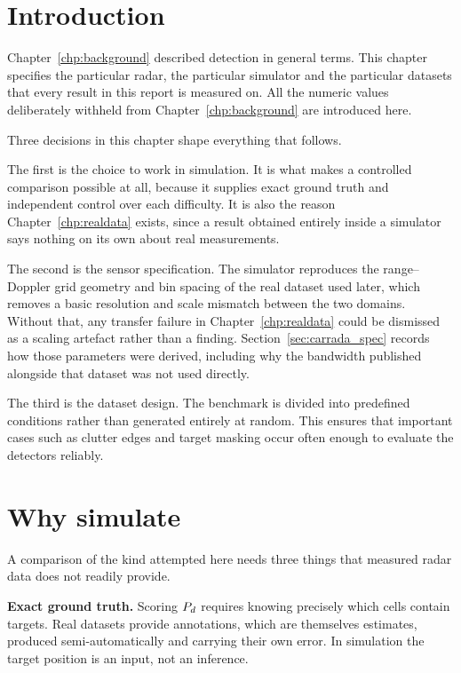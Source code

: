 
\section{Introduction}

Chapter~\ref{chp:background} described detection in general terms. This chapter specifies the
particular radar, the particular simulator and the particular datasets that every result in this
report is measured on. All the numeric values deliberately withheld from Chapter~\ref{chp:background}
are introduced here.

Three decisions in this chapter shape everything that follows.

The first is the choice to work in simulation. It is what makes a controlled comparison possible at
all, because it supplies exact ground truth and independent control over each difficulty. It is
also the reason Chapter~\ref{chp:realdata} exists, since a result obtained entirely inside a
simulator says nothing on its own about real measurements.

The second is the sensor specification. The simulator reproduces the range--Doppler grid geometry
and bin spacing of the real dataset used later, which removes a basic resolution and scale
mismatch between the two domains. Without that, any transfer failure in
Chapter~\ref{chp:realdata} could be dismissed as a scaling artefact rather than a finding.
Section~\ref{sec:carrada_spec} records how those parameters were derived, including why the
bandwidth published alongside that dataset was not used directly.

The third is the dataset design. The benchmark is divided into predefined conditions rather than
generated entirely at random. This ensures that important cases such as clutter edges and target
masking occur often enough to evaluate the detectors reliably.

\section{Why simulate}

A comparison of the kind attempted here needs three things that measured radar data does not
readily provide.

\textbf{Exact ground truth.} Scoring $P_{d}$ requires knowing precisely which cells contain targets.
Real datasets provide annotations, which are themselves estimates, produced semi-automatically and
carrying their own error. In simulation the target position is an input, not an inference.


